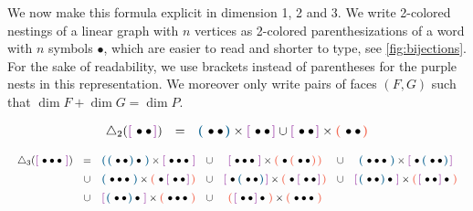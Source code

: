 \documentclass[10pt]{amsart}
\theoremstyle{remark}
\begin{document}
We now make this formula explicit in dimension 1, 2 and 3. 
We write 2-colored nestings of a linear graph with $n$ vertices as 2-colored parenthesizations of a word with $n$ symbols $\bullet$, which are easier to read and shorter to type, see \cref{fig:bijections}. 
For the sake of readability, we use brackets instead of parentheses for the purple nests in this representation.
We moreover only write pairs of faces $(F,G)$ such that $\dim F + \dim G = \dim P$.
\begin{equation*}
  \begin{matrix}
      \triangle_2(\purple{\bullet \bullet}) & = & \blue{\bullet \bullet} \times \purple{\bullet \bullet} \cup \purple{\bullet \bullet} \times \red{\bullet \bullet}
  \end{matrix}
\end{equation*}
\[ \resizebox{\hsize}{!}{$\displaystyle{ 
 \renewcommand*{\arraystretch}{1.5}
  \begin{matrix}
      \triangle_3(\purple{\bullet \bullet \bullet}) 
      & = & \blue{\blue{\bullet \bullet} \bullet} \times \purple{\bullet \bullet \bullet} 
      & \cup & \purple{\bullet \bullet \bullet} \times \red{\bullet \red{\bullet \bullet}}
      & \cup & \blue{\bullet \bullet \bullet} \times \purple{\bullet \blue{\bullet \bullet}} \\
      & \cup & \blue{\bullet \bullet \bullet} \times \red{\bullet \purple{\bullet \bullet}}  
      & \cup & \purple{\bullet \blue{\bullet \bullet}} \times \red{\bullet \purple{\bullet \bullet}} 
      & \cup & \purple{\blue{\bullet \bullet} \bullet} \times \red{\purple{\bullet \bullet} \bullet} \\
      & \cup & \purple{\blue{\bullet \bullet} \bullet} \times \red{\bullet \bullet \bullet} 
      & \cup & \red{\purple{\bullet \bullet} \bullet} \times \red{\bullet \bullet \bullet} 
  \end{matrix} }$} \]
 
\end{document}
